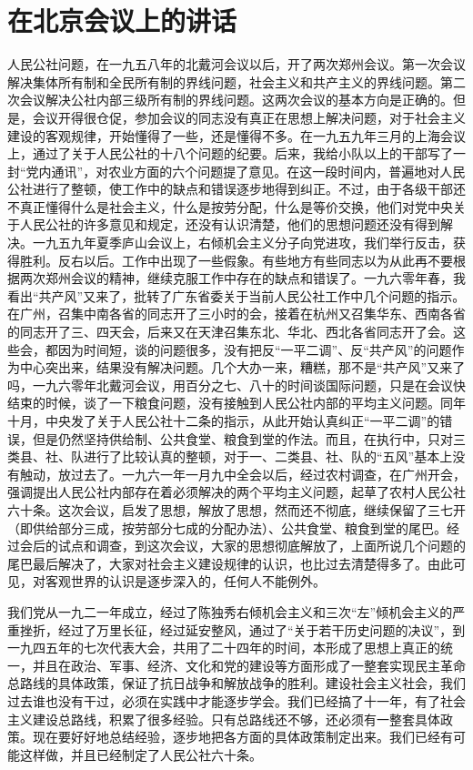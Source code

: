 \section[在北京会议上的讲话（一九六一年六月十二日）]{在北京会议上的讲话}

人民公社问题，在一九五八年的北戴河会议以后，开了两次郑州会议。第一次会议解决集体所有制和全民所有制的界线问题，社会主义和共产主义的界线问题。第二次会议解决公社内部三级所有制的界线问题。这两次会议的基本方向是正确的。但是，会议开得很仓促，参加会议的同志没有真正在思想上解决问题，对于社会主义建设的客观规律，开始懂得了一些，还是懂得不多。在一九五九年三月的上海会议上，通过了关于人民公社的十八个问题的纪要。后来，我给小队以上的干部写了一封“党内通讯”，对农业方面的六个问题提了意见。在这一段时间内，普遍地对人民公社进行了整顿，使工作中的缺点和错误逐步地得到纠正。不过，由于各级干部还不真正懂得什么是社会主义，什么是按劳分配，什么是等价交换，他们对党中央关于人民公社的许多意见和规定，还没有认识清楚，他们的思想问题还没有得到解决。一九五九年夏季庐山会议上，右倾机会主义分子向党进攻，我们举行反击，获得胜利。反右以后。工作中出现了一些假象。有些地方有些同志以为从此再不要根据两次郑州会议的精神，继续克服工作中存在的缺点和错误了。一九六零年春，我看出“共产风”又来了，批转了广东省委关于当前人民公社工作中几个问题的指示。在广州，召集中南各省的同志开了三小时的会，接着在杭州又召集华东、西南各省的同志开了三、四天会，后来又在天津召集东北、华北、西北各省同志开了会。这些会，都因为时间短，谈的问题很多，没有把反“一平二调”、反“共产风”的问题作为中心突出来，结果没有解决问题。几个大办一来，糟糕，那不是“共产风”又来了吗，一九六零年北戴河会议，用百分之七、八十的时间谈国际问题，只是在会议快结束的时候，谈了一下粮食问题，没有接触到人民公社内部的平均主义问题。同年十月，中央发了关于人民公社十二条的指示，从此开始认真纠正“一平二调”的错误，但是仍然坚持供给制、公共食堂、粮食到堂的作法。而且，在执行中，只对三类县、社、队进行了比较认真的整顿，对于一、二类县、社、队的“五风”基本上没有触动，放过去了。一九六一年一月九中全会以后，经过农村调查，在广州开会，强调提出人民公社内部存在着必须解决的两个平均主义问题，起草了农村人民公社六十条。这次会议，启发了思想，解放了思想，然而还不彻底，继续保留了三七开（即供给部分三成，按劳部分七成的分配办法）、公共食堂、粮食到堂的尾巴。经过会后的试点和调查，到这次会议，大家的思想彻底解放了，上面所说几个问题的尾巴最后解决了，大家对社会主义建设规律的认识，也比过去清楚得多了。由此可见，对客观世界的认识是逐步深入的，任何人不能例外。

我们党从一九二一年成立，经过了陈独秀右倾机会主义和三次“左”倾机会主义的严重挫折，经过了万里长征，经过延安整风，通过了“关于若干历史问题的决议”，到一九四五年的七次代表大会，共用了二十四年的时间，本形成了思想上真正的统一，并且在政治、军事、经济、文化和党的建设等方面形成了一整套实现民主革命总路线的具体政策，保证了抗日战争和解放战争的胜利。建设社会主义社会，我们过去谁也没有干过，必须在实践中才能逐步学会。我们已经搞了十一年，有了社会主义建设总路线，积累了很多经验。只有总路线还不够，还必须有一整套具体政策。现在要好好地总结经验，逐步地把各方面的具体政策制定出来。我们已经有可能这样做，并且已经制定了人民公社六十条。

